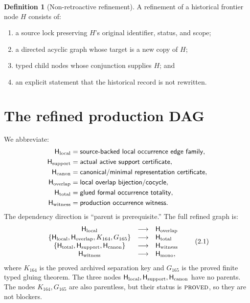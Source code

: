 \documentclass[11pt]{article}
\theoremstyle{definition}
\newtheorem{definition}[theorem]{Definition}
\theoremstyle{remark}
\newcommand{\PROVED}{\textnormal{\textsc{proved}}}
\newcommand{\Hmono}{\mathsf H_{\rm mono}}
\newcommand{\Hlocal}{\mathsf H_{\rm local}}
\newcommand{\Hsupport}{\mathsf H_{\rm support}}
\newcommand{\Hcanon}{\mathsf H_{\rm canon}}
\newcommand{\Hoverlap}{\mathsf H_{\rm overlap}}
\newcommand{\Htotal}{\mathsf H_{\rm total}}
\newcommand{\Hwitness}{\mathsf H_{\rm witness}}
\begin{document}
\begin{definition}[Non-retroactive refinement]\label{def:refine}
A refinement of a historical frontier node \(H\) consists of:
\begin{enumerate}[label=(\roman*),leftmargin=2.1em]
 \item a source lock preserving \(H\)'s original identifier, status,
       and scope;
 \item a directed acyclic graph whose target is a new copy of \(H\);
 \item typed child nodes whose conjunction supplies \(H\); and
 \item an explicit statement that the historical record is not
       rewritten.
\end{enumerate}
\end{definition}

\section{The refined production DAG}

We abbreviate:
\[
\begin{aligned}
\Hlocal&=\mathsf{source\mbox{-}backed\ local\ occurrence\ edge\ family},\\
\Hsupport&=\mathsf{actual\ active\ support\ certificate},\\
\Hcanon&=\mathsf{canonical/minimal\ representation\ certificate},\\
\Hoverlap&=\mathsf{local\ overlap\ bijection/cocycle},\\
\Htotal&=\mathsf{glued\ formal\ occurrence\ totality},\\
\Hwitness&=\mathsf{production\ occurrence\ witness}.
\end{aligned}
\]
The dependency direction is ``parent is prerequisite.''  The full
refined graph is:
\[
\begin{array}{ccl}
\Hlocal&\longrightarrow&\Hoverlap\\
\{\Hlocal,\Hoverlap,K_{164},G_{165}\}
 &\longrightarrow&\Htotal\\
\{\Htotal,\Hsupport,\Hcanon\}
 &\longrightarrow&\Hwitness\\
\Hwitness&\longrightarrow&\Hmono,
\end{array}
\tag{2.1}\label{eq:dag}
\]
where \(K_{164}\) is the proved archived separation key and
\(G_{165}\) is the proved finite typed gluing theorem.  The three
nodes \(\Hlocal,\Hsupport,\Hcanon\) have no parents.  The nodes
\(K_{164},G_{165}\) are also parentless, but their status is
\(\PROVED\), so they are not blockers.
\end{document}
